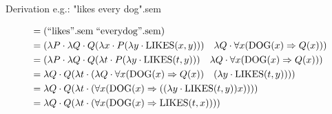 Derivation e.g.: "likes every dog".sem
\vspace{0.3cm}
\begin{tiny}
    \begin{equation*}
        \begin{aligned}
             & =(\mathrm{``likes".sem \;``every dog".sem})                                                                                                                           \\
             & =(\lambda P \cdot \lambda Q \cdot Q(\lambda x \cdot P(\lambda y \cdot \operatorname{LIKES}(x, y))) \quad \lambda Q \cdot \forall x(\mathrm{DOG}(x) \Rightarrow Q(x))) \\
             & =(\lambda P \cdot \lambda Q \cdot Q(\lambda t \cdot P(\lambda y \cdot \mathrm{LIKES}(t, y))) \quad \lambda Q \cdot \forall x(\mathrm{DOG}(x) \Rightarrow Q(x)))       \\
             & =\lambda Q \cdot Q(\lambda t \cdot(\lambda Q \cdot \forall x(\mathrm{DOG}(x) \Rightarrow Q(x)) \quad(\lambda y \cdot \operatorname{LIKES}(t, y))))                    \\
             & =\lambda Q \cdot Q(\lambda t \cdot(\forall x(\mathrm{DOG}(x) \Rightarrow((\lambda y \cdot \mathrm{LIKES}(t, y)) x))))                                                 \\
             & =\lambda Q \cdot Q(\lambda t \cdot(\forall x(\mathrm{DOG}(x) \Rightarrow \mathrm{LIKES}(t, x))))
        \end{aligned}
    \end{equation*}
\end{tiny}
\vspace{-0.4cm}
